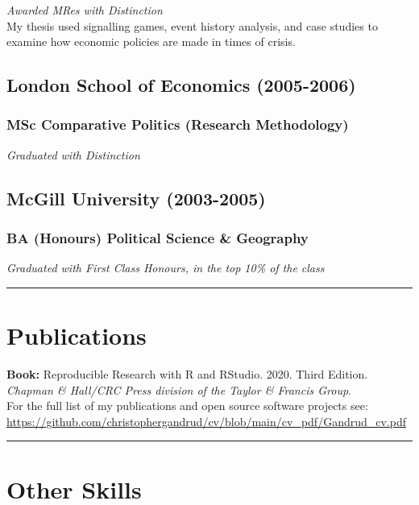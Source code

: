 \documentclass[a4paper]{article}
\begin{document}
\emph{Awarded MRes with Distinction} \\

\noindent My thesis used signalling games, event history analysis, and case studies to examine how economic policies are made in times of crisis.

\subsection*{London School of Economics (2005-2006)}
\subsubsection*{MSc Comparative Politics (Research Methodology)}

{\emph{Graduated with Distinction}}

\subsection*{McGill University (2003-2005)}
\subsubsection*{BA (Honours) Political Science \& Geography}

{\emph{Graduated with First Class Honours, in the top 10\% of the class}}

\vspace{0.25cm}
\medskip\hrule height 1pt
\vspace{0.5cm}


\section*{Publications}

\textbf{Book:} Reproducible Research with R and RStudio. 2020. Third Edition. {\emph{Chapman \& Hall/CRC Press division of the Taylor \& Francis Group}}. \\

\noindent For the full list of my publications and open source software projects see: \url{https://github.com/christophergandrud/cv/blob/main/cv_pdf/Gandrud_cv.pdf}

\vspace{0.5cm}
\medskip\hrule height 1pt
\vspace{0.5cm}

\section*{Other Skills}
\end{document}
